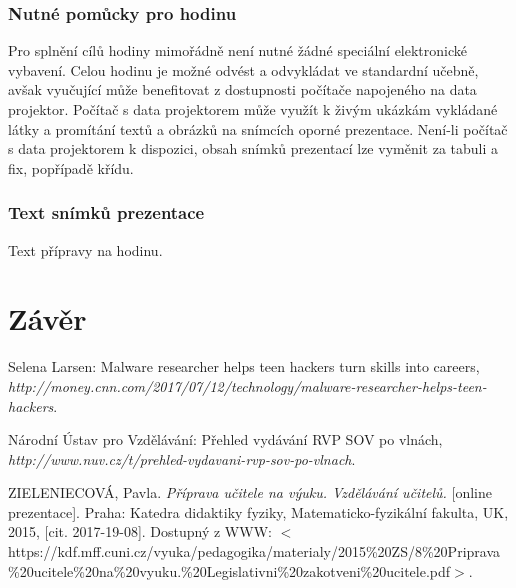 \documentclass[a4paper, 12pt]{article}
\begin{document}
\subsubsection{Nutné pomůcky pro hodinu}
Pro splnění cílů hodiny mimořádně není nutné žádné speciální elektronické vybavení. Celou hodinu je možné odvést a odvykládat ve standardní učebně, avšak vyučující může benefitovat z dostupnosti počítače napojeného na data projektor. Počítač s data projektorem může využít k živým ukázkám vykládané látky a promítání textů a obrázků na snímcích oporné prezentace. Není-li počítač s data projektorem k dispozici, obsah snímků prezentací lze vyměnit za tabuli a fix, popřípadě křídu.

\subsubsection{Text snímků prezentace}
Text přípravy na hodinu.

\newpage
\section{Závěr}







\newpage
\begin{thebibliography}{9}

    Selena Larsen: Malware researcher helps teen hackers turn skills into careers,
    \\\textit{http://money.cnn.com/2017/07/12/technology/malware-researcher-helps-teen-hackers}.

    Národní Ústav pro Vzdělávání: Přehled vydávání RVP SOV po vlnách,
    \\\textit{http://www.nuv.cz/t/prehled-vydavani-rvp-sov-po-vlnach}.

    ZIELENIECOVÁ, Pavla. \textit{Příprava učitele na výuku. Vzdělávání učitelů.} [online prezentace]. Praha: Katedra didaktiky fyziky, Matematicko-fyzikální fakulta, UK, 2015, [cit. 2017-19-08]. Dostupný z WWW: $<$https://kdf.mff.cuni.cz/vyuka/pedagogika/materialy/2015\%20ZS/8\%20Priprava\\\%20ucitele\%20na\%20vyuku.\%20Legislativni\%20zakotveni\%20ucitele.pdf$>$.

\end{thebibliography}
\end{document}
